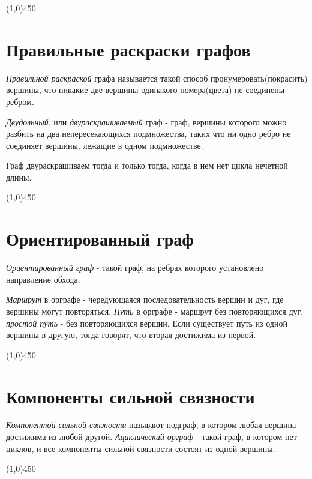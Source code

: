 \documentclass[a4paper,12pt]{article}
\begin{document}
	\begin{center}
		\line(1,0){450}
	\end{center}

	\section*{Правильные раскраски графов}
	\textit{Правильной раскраской} графа называется такой способ пронумеровать(покрасить) вершины, что никакие две вершины одинакого номера(цвета) не соединены ребром.
	
	\textit{Двудольный}, или \textit{двураскрашиваемый} граф - граф, вершины которого можно разбить на два непересекающихся подмножества, таких что ни одно ребро не соединяет вершины, лежащие в одном подмножестве.
	
	Граф двураскрашиваем тогда и только тогда, когда в нем нет цикла нечетной длины.
	
	\begin{center}
		\line(1,0){450}
	\end{center}

	\section*{Ориентированный граф}
	\textit{Ориентированный граф} - такой граф, на ребрах которого установлено направление обхода.
	
	\textit{Маршрут} в орграфе - чередующаяся последовательность вершин и дуг, где вершины могут повторяться.
	\textit{Путь} в орграфе - маршрут без повторяющихся дуг, \textit{простой путь} - без повторяющихся вершин. Если существует путь из одной вершины в другую, тогда говорят, что вторая достижима из первой.
	
	\begin{center}
		\line(1,0){450}
	\end{center}

	\section*{Компоненты сильной связности}
	\textit{Компонентой сильной связности} называют подграф, в котором любая вершина достижима из любой другой.
	\textit{Ациклический орграф} - такой граф, в котором нет циклов, и все компоненты сильной связности состоят из одной вершины.
	
	\begin{center}
		\line(1,0){450}
	\end{center}
\end{document}

